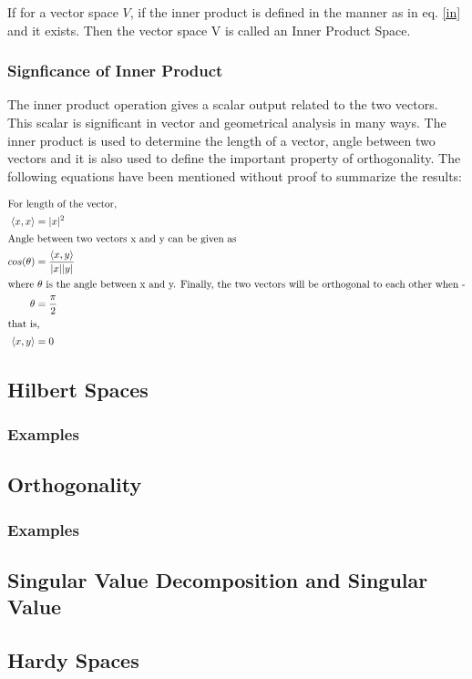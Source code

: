 \documentclass[a4paper,12pt]{article}
\begin{document}
		If for a vector space $V$, if the inner product is defined in the manner as in eq. \ref{in} and it exists. Then the vector space V is called an Inner Product Space.
		\subsubsection{Signficance of Inner Product}
			The inner product operation gives a scalar output related to the two vectors. This scalar is significant in vector and geometrical analysis in many ways. The inner product is used to determine the length of a vector, angle between two vectors and it is also used to define the important property of orthogonality. The following equations have been mentioned without proof to summarize the results:
			
			\begin{align}
				\intertext{For length of the vector,}
				\left\langle x, x \right\rangle &= |x|^{2} \\
				\intertext{Angle between two vectors x and y can be given as}
				cos(\theta)&= \frac{\left\langle x, y \right\rangle}{|x| |y|} \\
				\intertext{where $\theta$ is the angle between x and y. Finally, the two vectors will be orthogonal to each other when -}
				\theta &= \frac{\pi}{2} \\
				\intertext{that is, }
				\left\langle x, y \right\rangle &= 0 
			\end{align}
			
	\subsection{Hilbert Spaces}
		\subsubsection{Examples}
	\subsection{Orthogonality}
		\subsubsection{Examples}
	\subsection{Singular Value Decomposition and Singular Value}
	\subsection{Hardy Spaces}
\end{document}
